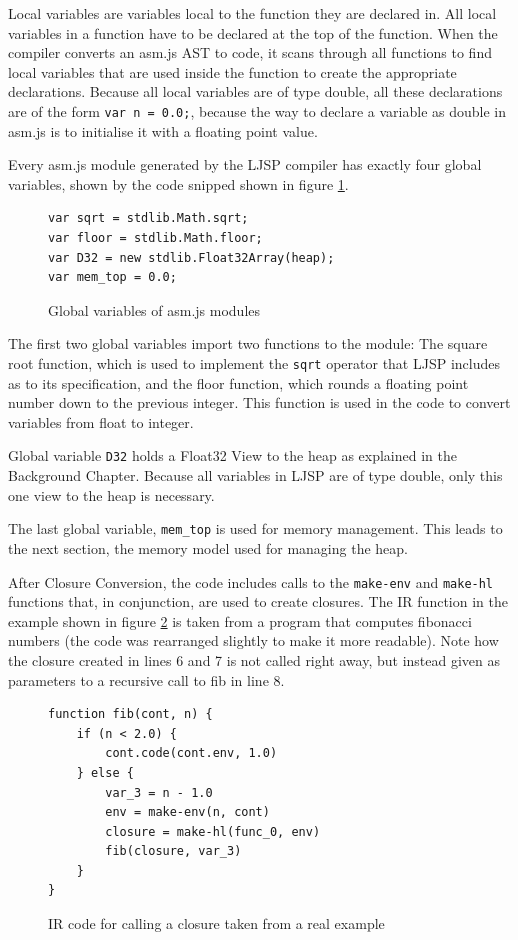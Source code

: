 \documentclass[11pt]{report}
\begin{document}
Local variables are variables local to the function they are declared in. All local variables in a function have to be declared at the top of the function. When the compiler converts an asm.js AST to code, it scans through all functions to find local variables that are used inside the function to create the appropriate declarations. Because all local variables are of type double, all these declarations are of the form \texttt{var n = 0.0;}, because the way to declare a variable as double in asm.js is to initialise it with a floating point value.

Every asm.js module generated by the LJSP compiler has exactly four global variables, shown by the code snipped shown in figure \ref{iasmjsmm1}. 
\begin{figure}[ht]
\begin{lstlisting}
var sqrt = stdlib.Math.sqrt;
var floor = stdlib.Math.floor;
var D32 = new stdlib.Float32Array(heap);
var mem_top = 0.0;
\end{lstlisting}
\caption{Global variables of asm.js modules}
\label{iasmjsmm1}
\end{figure}

The first two global variables import two functions to the module: The square root function, which is used to implement the \texttt{sqrt} operator that LJSP includes as to its specification, and the floor function, which rounds a floating point number down to the previous integer. This function is used in the code to convert variables from float to integer.

Global variable \texttt{D32} holds a Float32 View to the heap as explained in the Background Chapter. Because all variables in LJSP are of type double, only this one view to the heap is necessary.

The last global variable, \texttt{mem_top} is used for memory management. This leads to the next section, the memory model used for managing the heap.

After Closure Conversion, the code includes calls to the \texttt{make-env} and \texttt{make-hl} functions that, in conjunction, are used to create closures.  The IR function in the example shown in figure \ref{iasmjsmm2} is taken from a program that computes fibonacci numbers (the code was rearranged slightly to make it more readable). Note how the closure created in lines 6 and 7 is not called right away, but instead given as parameters to a recursive call to fib in line 8.

\begin{figure}[ht]
\begin{lstlisting}
function fib(cont, n) {
    if (n < 2.0) {
        cont.code(cont.env, 1.0)
    } else {
        var_3 = n - 1.0
        env = make-env(n, cont)
        closure = make-hl(func_0, env)
        fib(closure, var_3)
    }
}
\end{lstlisting}
\caption{IR code for calling a closure taken from a real example}
\label{iasmjsmm2}
\end{figure}
\end{document}
